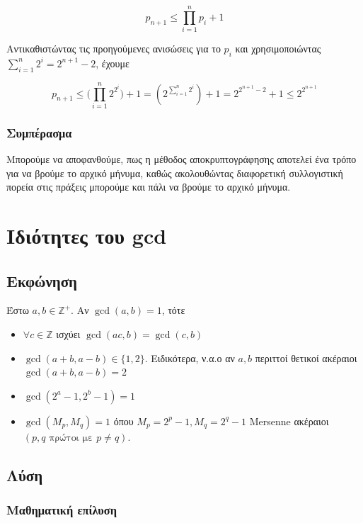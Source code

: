 \documentclass[oneside]{article}
\begin{document}
\begin{equation}
    p_{n+1} \leq \prod_{i=1}^n p_i + 1
\end{equation}

Αντικαθιστώντας τις προηγούμενες ανισώσεις για το $p_i$ και χρησιμοποιώντας $\sum_{i=1}^{n} 2^i = 2^{n+1} - 2$, έχουμε

\begin{equation}
    p_{n+1} \leq \big( \prod_{i=1}^n 2^{2^{i}} \big) + 1 = (2^{\sum_{i=1}^{n} 2^i}) + 1 = 2^{2^{n+1}-2} + 1 \leq 2^{2^{n+1}}
\end{equation}

\subsubsection{Συμπέρασμα}

Μπορούμε να αποφανθούμε, πως η μέθοδος αποκρυπτογράφησης αποτελεί ένα τρόπο για να βρούμε το αρχικό μήνυμα, καθώς ακολουθώντας διαφορετική συλλογιστική πορεία στις πράξεις μπορούμε και πάλι να βρούμε το αρχικό μήνυμα.

\section{Ιδιότητες του gcd}

\subsection{Εκφώνηση}

Έστω $a,b \in \mathbb{Z}^+ $. Αν $\gcd(a,b) = 1$, τότε

\begin{itemize}
    \item $\forall c \in \mathbb{Z}$ ισχύει $\gcd(ac, b) = \gcd(c, b)$
    \item $\gcd(a+b, a-b) \in \{1,2\}$. Ειδικότερα, ν.α.ο αν $a,b$ περιττοί θετικοί ακέραιοι $\gcd(a+b,a-b) = 2$
    \item $\gcd(2^a - 1, 2^b - 1) = 1$
    \item $\gcd(M_p, M_q) = 1$ όπου $M_p = 2^p - 1, M_q = 2^q - 1$ Mersenne ακέραιοι $(p, q \text{ πρώτοι με } p \neq q)$.
\end{itemize}

\subsection{Λύση} 

\subsubsection{Μαθηματική επίλυση}
\end{document}
